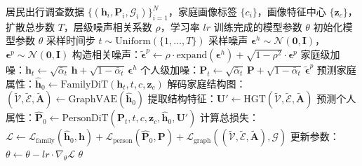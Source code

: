 \begin{algorithm}[H]
\caption{HiDiT模型训练流程}\label{alg.popsyn.training}
\begin{algorithmic}[1]
\REQUIRE 居民出行调查数据 $\{(\mathbf{h}_i, \mathbf{P}_i, \mathcal{G}_i)\}_{i=1}^N$，家庭画像标签 $\{c_i\}$，画像特征中心 $\{\mathbf{z}_c\}$，扩散总步数 $T$，层级噪声相关系数 $\rho$，学习率 $\mathit{lr}$
\ENSURE 训练完成的模型参数 $\theta$
\STATE 初始化模型参数 $\theta$
    \STATE 采样时间步 $t \sim \text{Uniform}(\{1, \ldots, T\})$
    \STATE 采样噪声 $\boldsymbol{\epsilon}^h \sim \mathcal{N}(\mathbf{0}, \mathbf{I})$，$\boldsymbol{\epsilon}^p \sim \mathcal{N}(\mathbf{0}, \mathbf{I})$
    \STATE 构造相关噪声：$\tilde{\boldsymbol{\epsilon}}^p \leftarrow \rho \cdot \text{expand}(\boldsymbol{\epsilon}^h) + \sqrt{1-\rho^2} \cdot \boldsymbol{\epsilon}^p$
    \STATE 家庭级加噪：$\mathbf{h}_t \leftarrow \sqrt{\bar{\alpha}_t}\, \mathbf{h} + \sqrt{1-\bar{\alpha}_t}\, \boldsymbol{\epsilon}^h$
    \STATE 个人级加噪：$\mathbf{P}_t \leftarrow \sqrt{\bar{\alpha}_t}\, \mathbf{P} + \sqrt{1-\bar{\alpha}_t}\, \tilde{\boldsymbol{\epsilon}}^p$
    \STATE 预测家庭属性：$\hat{\mathbf{h}}_0 \leftarrow \text{FamilyDiT}(\mathbf{h}_t, t, c, \mathbf{z}_c)$
    \STATE 解码家庭结构图：$(\tilde{\mathcal{V}}, \tilde{\mathcal{E}}, \tilde{\mathbf{A}}) \leftarrow \text{GraphVAE}(\hat{\mathbf{h}}_0)$
    \STATE 提取结构特征：$\mathbf{U}' \leftarrow \text{HGT}(\tilde{\mathcal{V}}, \tilde{\mathcal{E}}, \tilde{\mathbf{A}})$
    \STATE 预测个人属性：$\hat{\mathbf{P}}_0 \leftarrow \text{PersonDiT}(\mathbf{P}_t, t, c, \mathbf{z}_c, \hat{\mathbf{h}}_0, \mathbf{U}')$
    \STATE 计算总损失：$\mathcal{L} \leftarrow \mathcal{L}_{\text{family}}(\hat{\mathbf{h}}_0, \mathbf{h}) + \mathcal{L}_{\text{person}}(\hat{\mathbf{P}}_0, \mathbf{P}) + \mathcal{L}_{\text{graph}}((\tilde{\mathcal{V}}, \tilde{\mathcal{E}}, \tilde{\mathbf{A}}), \mathcal{G})$
    \STATE 更新参数：$\theta \leftarrow \theta - \mathit{lr} \cdot \nabla_\theta \mathcal{L}$
  \ENDFOR
\ENDFOR
\RETURN $\theta$
\end{algorithmic}
\end{algorithm}

